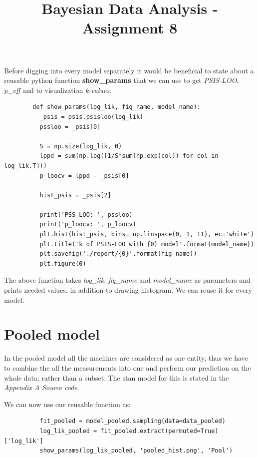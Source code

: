 \documentclass[11pt,a4paper,english]{article}
\title{Bayesian Data Analysis - Assignment 8}
\author{}
\begin{document}
        \maketitle
      Before digging into every model separately it would be beneficial to state about a reusable python function \textbf{show\_params} that we can use to get \textit{PSIS-LOO}, \textit{p\_eff} and to visualization \textit{k-values}.

      \begin{verbatim}
        def show_params(log_lik, fig_name, model_name):
          _psis = psis.psisloo(log_lik)
          pssloo = _psis[0]

          S = np.size(log_lik, 0)
          lppd = sum(np.log([1/S*sum(np.exp(col)) for col in log_lik.T]))
          p_loocv = lppd - _psis[0]

          hist_psis = _psis[2]

          print('PSS-LOO: ', pssloo)
          print('p_loocv: ', p_loocv)
          plt.hist(hist_psis, bins= np.linspace(0, 1, 11), ec='white')
          plt.title('k of PSIS-LOO with {0} model'.format(model_name))
          plt.savefig('./report/{0}'.format(fig_name))
          plt.figure(0)
      \end{verbatim}

      The above function takes \textit{log\_lik}, \textit{fig\_name} and \textit{model\_name} as parameters and prints needed values, in addition to drawing histogram. We can reuse it for every model.

      \section{Pooled model}
        In the pooled model all the machines are considered as one entity, thus we have to combine the all the measurements into one and perform our prediction on the whole data; rather than a subset. The stan model for this is stated in the \textit{Appendix A Source code}.

        We can now use our reusable function as:
        \begin{verbatim}
          fit_pooled = model_pooled.sampling(data=data_pooled)
          log_lik_pooled = fit_pooled.extract(permuted=True)['log_lik']
          show_params(log_lik_pooled, 'pooled_hist.png', 'Pool')
        \end{verbatim}
\end{document}
